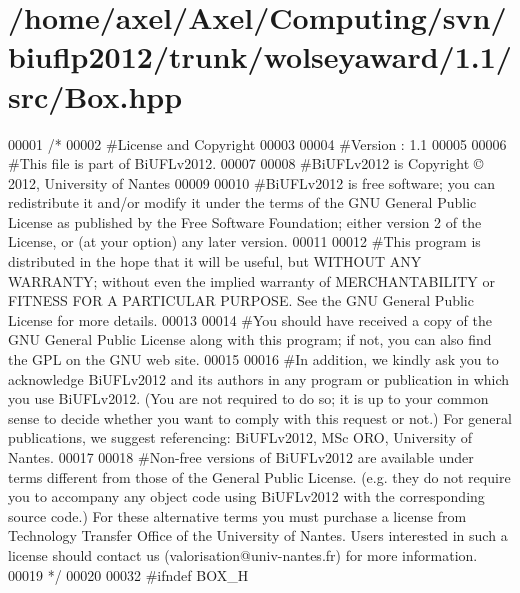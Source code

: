 \hypertarget{Box_8hpp_source}{\section{/home/axel/\-Axel/\-Computing/svn/biuflp2012/trunk/wolseyaward/1.1/src/\-Box.hpp}
}

\begin{DoxyCode}
00001 \textcolor{comment}{/*}
00002 \textcolor{comment}{ #License and Copyright}
00003 \textcolor{comment}{ }
00004 \textcolor{comment}{ #Version : 1.1}
00005 \textcolor{comment}{ }
00006 \textcolor{comment}{ #This file is part of BiUFLv2012.}
00007 \textcolor{comment}{ }
00008 \textcolor{comment}{ #BiUFLv2012 is Copyright © 2012, University of Nantes}
00009 \textcolor{comment}{ }
00010 \textcolor{comment}{ #BiUFLv2012 is free software; you can redistribute it and/or modify it under
       the terms of the GNU General Public License as published by the Free Software
       Foundation; either version 2 of the License, or (at your option) any later version.}
00011 \textcolor{comment}{ }
00012 \textcolor{comment}{ #This program is distributed in the hope that it will be useful, but WITHOUT
       ANY WARRANTY; without even the implied warranty of MERCHANTABILITY or FITNESS FOR
       A PARTICULAR PURPOSE. See the GNU General Public License for more details.}
00013 \textcolor{comment}{ }
00014 \textcolor{comment}{ #You should have received a copy of the GNU General Public License along with
       this program; if not, you can also find the GPL on the GNU web site.}
00015 \textcolor{comment}{ }
00016 \textcolor{comment}{ #In addition, we kindly ask you to acknowledge BiUFLv2012 and its authors in
       any program or publication in which you use BiUFLv2012. (You are not required to
       do so; it is up to your common sense to decide whether you want to comply with
       this request or not.) For general publications, we suggest referencing: 
       BiUFLv2012, MSc ORO, University of Nantes.}
00017 \textcolor{comment}{ }
00018 \textcolor{comment}{ #Non-free versions of BiUFLv2012 are available under terms different from
       those of the General Public License. (e.g. they do not require you to accompany any
       object code using BiUFLv2012 with the corresponding source code.) For these
       alternative terms you must purchase a license from Technology Transfer Office of the
       University of Nantes. Users interested in such a license should contact us
       (valorisation@univ-nantes.fr) for more information.}
00019 \textcolor{comment}{ */}
00020  
00032 \textcolor{preprocessor}{#ifndef BOX\_H}

\end{DoxyCode}
